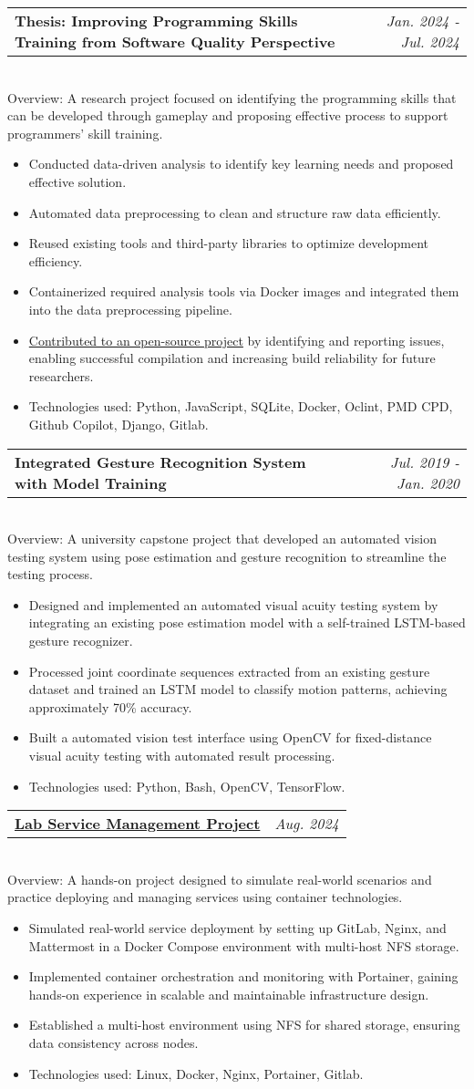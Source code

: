 \documentclass[letterpaper,11pt]{article}
\makeatletter
\newcommand{\jobSubheading}[3]{  
  \vspace{-1pt}\item
    \begin{tabular*}{0.97\textwidth}{l@{\extracolsep{\fill}}r}
      \textbf{#1} & \textit{\small#2} \\  %
    \end{tabular*}
    \\ \small #3  %
  \vspace{-5pt}
}
\newcommand{\jobSubItem}[1]{  
  \item \small #1 \vspace{-4pt}
}
\newcommand{\resumeItemListStart}{\begin{itemize}}
\newcommand{\resumeItemListEnd}{\end{itemize}\vspace{-5pt}}
\makeatother
\begin{document}
\jobSubheading
      {Thesis: Improving Programming Skills Training from Software Quality Perspective}{Jan. 2024 - Jul. 2024}
      {Overview: A research project focused on identifying the programming skills that can be developed through gameplay and proposing effective process to support programmers' skill training.}
      \resumeItemListStart
        \jobSubItem{Conducted data-driven analysis to identify key learning needs and proposed effective solution.}
        \jobSubItem{Automated data preprocessing to clean and structure raw data efficiently.}
        \jobSubItem{Reused existing tools and third-party libraries to optimize development efficiency.}
        \jobSubItem{Containerized required analysis tools via Docker images and integrated them into the data preprocessing pipeline.}
        \jobSubItem{\href{https://github.com/ptidejteam/ptidej-Ptidej/issues?q=is\%3Aissue\%20state\%3Aclosed\%20author\%3Ayihsuan1102}{Contributed to an open-source project} by identifying and reporting issues, enabling successful compilation and increasing build reliability for future researchers.}
        \jobSubItem{Technologies used: Python, JavaScript, SQLite, Docker, Oclint, PMD CPD, Github Copilot, Django, Gitlab.}
      \resumeItemListEnd
      \jobSubheading
  {Integrated Gesture Recognition System with Model Training}{Jul. 2019 - Jan. 2020}
  {Overview: A university capstone project that developed an automated vision testing system using pose estimation and gesture recognition to streamline the testing process.}
  \resumeItemListStart
    \jobSubItem{Designed and implemented an automated visual acuity testing system by integrating an existing pose estimation model with a self-trained LSTM-based gesture recognizer.}
    \jobSubItem{Processed joint coordinate sequences extracted from an existing gesture dataset and trained an LSTM model to classify motion patterns, achieving approximately 70\% accuracy.}
    \jobSubItem{Built a automated vision test interface using OpenCV for fixed-distance visual acuity testing with automated result processing.}
    \jobSubItem{Technologies used: Python, Bash, OpenCV, TensorFlow.}
  \resumeItemListEnd


\jobSubheading
      {\href{https://github.com/yihsuan1102/Service-management}{Lab Service Management Project}}{Aug. 2024}
      {Overview: A hands-on project designed to simulate real-world scenarios and practice deploying and managing services using container technologies.}
      
      \resumeItemListStart
        \jobSubItem{Simulated real-world service deployment by setting up GitLab, Nginx, and Mattermost in a Docker Compose environment with multi-host NFS storage.}
        \jobSubItem{Implemented container orchestration and monitoring with Portainer, gaining hands-on experience in scalable and maintainable infrastructure design.}
        \jobSubItem{Established a multi-host environment using NFS for shared storage, ensuring data consistency across nodes.}
        \jobSubItem{Technologies used: Linux, Docker, Nginx, Portainer, Gitlab.}
      \resumeItemListEnd
\end{document}
